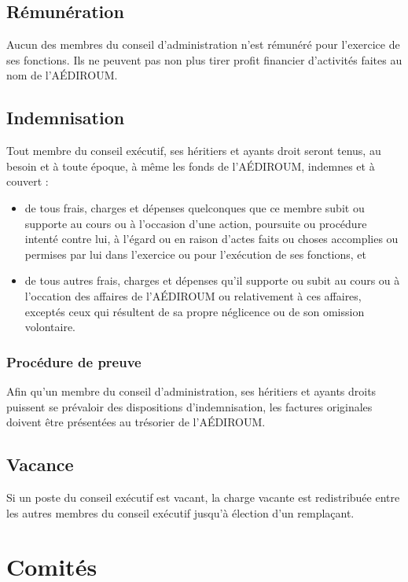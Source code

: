 \documentclass[12pt]{article}
\begin{document}
\subsection{Rémunération}

Aucun des membres du conseil d'administration n'est rémunéré pour l'exercice de ses fonctions. Ils ne peuvent pas non plus tirer profit financier d'activités faites au nom de l'AÉDIROUM.

\subsection{Indemnisation}

Tout membre du conseil exécutif, ses héritiers et ayants droit seront tenus, au besoin et à toute époque, à même les fonds de l'AÉDIROUM, indemnes et à couvert :
\begin{itemize}
\item de tous frais, charges et dépenses quelconques que ce membre subit ou supporte au cours ou à l'occasion d'une action, poursuite ou procédure intenté contre lui, à l'égard ou en raison d'actes faits ou choses accomplies ou permises par lui dans l'exercice ou pour l'exécution de ses fonctions, et
\item de tous autres frais, charges et dépenses qu'il supporte ou subit au cours ou à l'occation des affaires de l'AÉDIROUM ou relativement à ces affaires, exceptés ceux qui résultent de sa propre néglicence ou de son omission volontaire.
\end{itemize}

\subsubsection{Procédure de preuve}

Afin qu'un membre du conseil d'administration, ses héritiers et ayants droits puissent se prévaloir des dispositions d'indemnisation, les factures originales doivent être présentées au trésorier de l'AÉDIROUM.

\subsection{Vacance}

Si un poste du conseil exécutif est vacant, la charge vacante est redistribuée entre les autres membres du conseil exécutif jusqu'à élection d'un remplaçant.

\section{Comités}
\end{document}
